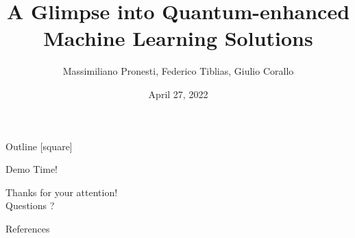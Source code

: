 \documentclass[10pt]{beamer}
\title{A Glimpse into Quantum-enhanced Machine Learning Solutions}
\date{April 27, 2022}
\author{
	Massimiliano Pronesti, 
	Federico Tiblias, 
	Giulio Corallo
}
\institute{Amadeus Knowledge Sharing Session}
\begin{document}
	
	\maketitle
	
	
	
	\begin{frame}[plain]{Outline}
		[square]
		\tableofcontents
	\end{frame}
	
	    
    
	
	
	
	\begin{frame}[standout]
		Demo Time!
	\end{frame}
	
	
    
	
	
	\begin{frame}[standout]
		Thanks for your attention!\\
		Questions ? ~\alert{\faSmileO}~
	\end{frame}
	
	\nocite{*}
	\appendix
	
	\begin{frame}[allowframebreaks]{References}
		
		
	\end{frame}
	
\end{document}
